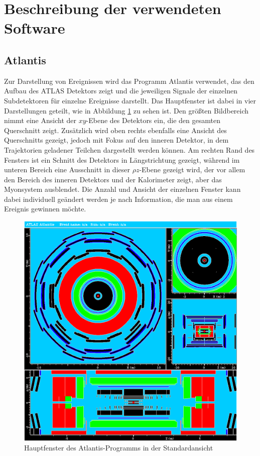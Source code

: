 \documentclass[11pt, a4paper]{article}
\numberwithin{equation}{section}
\begin{document}
\section{Beschreibung der verwendeten Software}

\subsection{Atlantis}

Zur Darstellung von Ereignissen wird das Programm Atlantis verwendet, das den Aufbau des ATLAS Detektors zeigt und die jeweiligen Signale der einzelnen Subdetektoren für einzelne Ereignisse darstellt.
Das Hauptfenster ist dabei in vier Darstellungen geteilt, wie in Abbildung \ref{fig:atlantis} zu sehen ist.
Den größten Bildbereich nimmt eine Ansicht der $xy$-Ebene des Detektors ein, die den gesamten Querschnitt zeigt.
Zusätzlich wird oben rechts ebenfalls eine Ansicht des Querschnitts gezeigt, jedoch mit Fokus auf den inneren Detektor, in dem Trajektorien geladener Teilchen dargestellt werden können. Am rechten Rand des Fensters ist ein Schnitt des Detektors in Längstrichtung gezeigt, während im unteren Bereich eine Ausschnitt in dieser $\rho z$-Ebene gezeigt wird, der vor allem den Bereich des inneren Detektors und der Kalorimeter zeigt, aber das Myonsystem ausblendet.
Die Anzahl und Ansicht der einzelnen Fenster kann dabei individuell geändert werden je nach Information, die man aus einem Ereignis gewinnen möchte.
\begin{figure}[htbp]
	\centering
	\includegraphics[width=\textwidth]{./data/atlantis/atlantis_empty.png}
	\caption{Hauptfenster des Atlantis-Programms in der Standardansicht}
	\label{fig:atlantis}
\end{figure}
\end{document}

